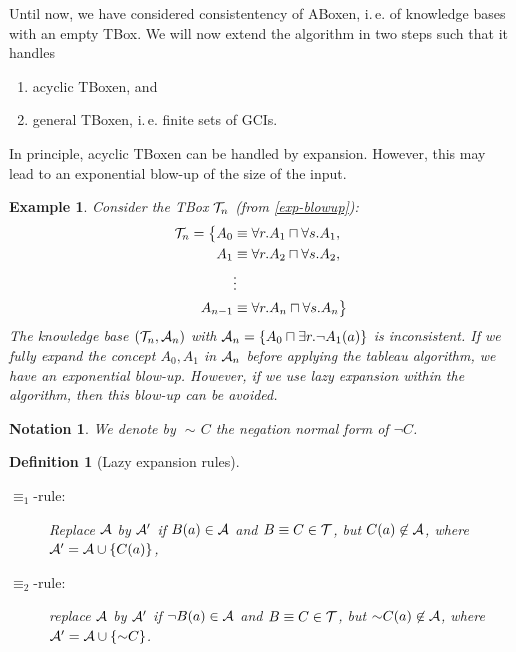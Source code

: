 \documentclass[openany]{scrbook}
\theoremstyle{break}
\newtheorem{Definition}[Theorem]{Definition}
\theoremstyle{nonumberbreak}
\newtheorem{Example}{Example}
\newtheorem{Notation}{Notation}
\theoremstyle{nonumberplain}
\theoremstyle{nonumberbreak}
\newcommand{\set}[1]{\left\{#1\right\}}
\newcommand{\ie}{i{.}\,e{.}\xspace}
\newcommand{\nnf}{\mathop{\sim\!}}
\begin{document}
Until now, we have considered consistentency of ABoxen, \ie of
knowledge bases with an empty TBox. We will now extend the algorithm
in two steps such that it handles
\begin{enumerate}
\item acyclic TBoxen, and
\item general TBoxen, \ie finite sets of GCIs.
\end{enumerate}

In principle, acyclic TBoxen can be handled by expansion. However,
this may lead to an exponential blow-up of the size of the input.

\begin{Example}
  \label{4.10}
  Consider the TBox ${\cal T}_n$ (from \cref{exp-blowup}):
  \begin{align*}
    {\cal T}_n = \big\{ A_0 & \equiv \forall r. A_1 \sqcap \forall
        s. A_1, \\
        A_1 & \equiv \forall r. A_2 \sqcap \forall s. A_2, \\
        & \vdots \\
        A_{n - 1} & \equiv \forall r. A_n \sqcap \forall s. A_n \big\}
  \end{align*}
  The knowledge base $({\cal T}_n, {\cal A}_n)$ with ${\cal A}_n =
  \set{A_0 \sqcap \exists r. \neg A_1 (a)}$ is inconsistent. If we
  fully expand the concept $A_0, A_1$ in ${\cal A}_n$ before applying
  the tableau algorithm, we have an exponential blow-up. However, if
  we use lazy expansion within the algorithm, then this blow-up can be
  avoided.
\end{Example}

\begin{Notation}
  We denote by $\nnf C$ the negation normal form of $\neg C$.
\end{Notation}

\begin{Definition}[Lazy expansion rules]
  \label{4.11}
  \begin{description}
  \item[$\equiv_1$-rule:] Replace ${\cal A}$ by ${\cal A}'$ if $B(a)
    \in {\cal A}$ and $B \equiv C \in {\cal T}$, but $C(a) \not\in
    {\cal A}$, where ${\cal A}' = {\cal A} \cup \set{C(a)}$,
  \item[$\equiv_2$-rule:] replace ${\cal A}$ by ${\cal A}'$ if $\neg
    B(a) \in {\cal A}$ and $B \equiv C \in {\cal T}$, but $\nnf C(a)
    \not\in {\cal A}$, where ${\cal A}' = {\cal A} \cup \set{\nnf
      C}$.
  \end{description}
\end{Definition}
\end{document}
